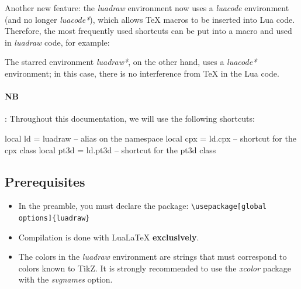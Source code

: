 Another new feature: the \emph{luadraw} environment now uses a \emph{luacode} environment (and no longer \emph{luacode*}), which allows TeX macros to be inserted into Lua code. Therefore, the most frequently used shortcuts can be put into a macro and used in \emph{luadraw} code, for example:


The starred environment \emph{luadraw*}, on the other hand, uses a \emph{luacode*} environment; in this case, there is no interference from \TeX{} in the Lua code.

\paragraph{NB}: Throughout this documentation, we will use the following shortcuts:

\begin{Luacode}
local ld = luadraw -- alias on the namespace
local cpx = ld.cpx -- shortcut for the cpx class
local pt3d = ld.pt3d -- shortcut for the pt3d class
\end{Luacode}


\subsection{Prerequisites}

\begin{itemize}
\item In the preamble, you must declare the \luadrawenv package: \verb|\usepackage[global options]{luadraw}|
\item Compilation is done with LuaLaTeX \textbf{exclusively}.
\item The colors in the \emph{luadraw} environment are strings that must correspond to colors known to TikZ. It is strongly recommended to use the \emph{xcolor} package with the \emph{svgnames} option.
\end{itemize}


